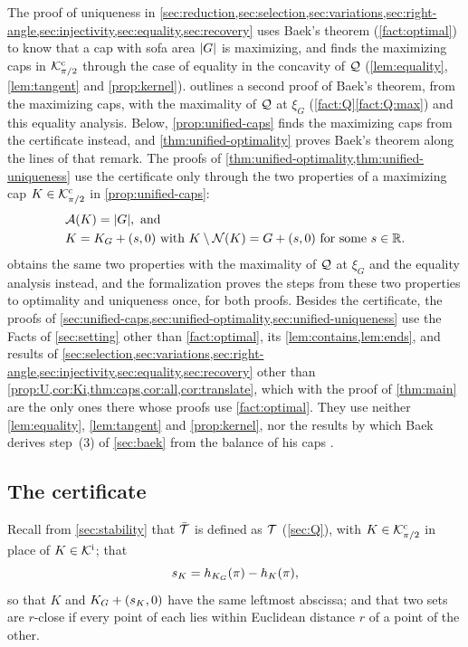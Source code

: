 The proof of uniqueness in
\cref{sec:reduction,sec:selection,sec:variations,sec:right-angle,sec:injectivity,sec:equality,sec:recovery}
uses Baek's theorem (\cref{fact:optimal}) to know that a cap with sofa area
$\lvert G\rvert$ is maximizing, and finds the maximizing caps in $\mathcal{K}^{\mathrm{c}}_{\pi/2}$ through
the case of equality in the concavity of $\mathcal{Q}$ (\cref{lem:equality},
\cref{lem:tangent} and \cref{prop:kernel}).  outlines a
second proof of Baek's theorem, from the maximizing caps, with the maximality of
$\mathcal{Q}$ at $\xi_G$ (\cref{fact:Q}\ref{fact:Q:max}) and this equality analysis. Below, \cref{prop:unified-caps} finds the maximizing
caps from the certificate instead, and \cref{thm:unified-optimality} proves
Baek's theorem along the lines of that remark. The proofs of
\cref{thm:unified-optimality,thm:unified-uniqueness} use the certificate only
through the two properties of a maximizing cap $K\in\mathcal{K}^{\mathrm{c}}_{\pi/2}$ in
\cref{prop:unified-caps}:
\begin{align*}
  &\mathcal{A}(K)=\lvert G\rvert,\text{ and}\\
  &K=K_G+(s,0)\text{ with }K\setminus\mathcal{N}(K)=G+(s,0)\text{ for some }s\in\mathbb{R}.
\end{align*}
 obtains the same two properties with the maximality of $\mathcal{Q}$
at $\xi_G$ and the equality analysis instead, and the formalization proves the
steps from these two properties to optimality and uniqueness once, for both
proofs. Besides the certificate, the proofs of
\cref{sec:unified-caps,sec:unified-optimality,sec:unified-uniqueness} use the
Facts of \cref{sec:setting} other than \cref{fact:optimal}, its
\cref{lem:contains,lem:ends}, and results of
\cref{sec:selection,sec:variations,sec:right-angle,sec:injectivity,sec:equality,sec:recovery}
other than \cref{prop:U,cor:Ki,thm:caps,cor:all,cor:translate}, which with the
proof of \cref{thm:main} are the only ones there whose proofs use
\cref{fact:optimal}. They use neither \cref{lem:equality}, \cref{lem:tangent}
and \cref{prop:kernel}, nor the results by which Baek derives step~(3) of
\cref{sec:baek} from the balance of his caps .

\subsection{The certificate}\label{sec:unified-certificate}

Recall from \cref{sec:stability} that $\bar{\mathcal{T}}$ is defined as $\mathcal{T}$
(\cref{sec:Q}), with $K\in\mathcal{K}^{\mathrm{c}}_{\pi/2}$ in place of $K\in\mathcal{K}^{\mathrm{i}}$; that
\[
  s_K=h_{K_G}(\pi)-h_K(\pi),
\]
so that $K$ and $K_G+(s_K,0)$ have the same leftmost abscissa; and that two
sets are $r$-close if every point of each lies within Euclidean distance $r$ of
a point of the other.

